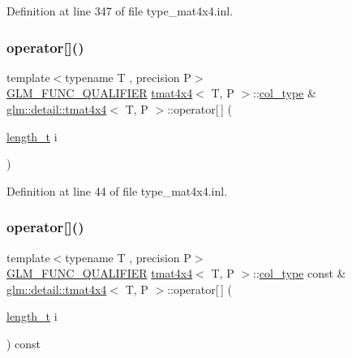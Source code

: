 Definition at line 347 of file type\+\_\+mat4x4.\+inl.

\mbox{\label{structglm_1_1detail_1_1tmat4x4_a92cd87a0fb94052edec19265cfa505dd}} 
\subsubsection{\texorpdfstring{operator[]()}{operator[]()}\hspace{0.1cm}{\footnotesize\ttfamily [1/2]}}
{\footnotesize\ttfamily template$<$typename T , precision P$>$ \\
\hyperlink{setup_8hpp_a33fdea6f91c5f834105f7415e2a64407}{G\+L\+M\+\_\+\+F\+U\+N\+C\+\_\+\+Q\+U\+A\+L\+I\+F\+I\+ER} \hyperlink{structglm_1_1detail_1_1tmat4x4}{tmat4x4}$<$ T, P $>$\+::\hyperlink{structglm_1_1detail_1_1tmat4x4_ade9e794ddd9c2758005f29ddb84e320f}{col\+\_\+type} \& \hyperlink{structglm_1_1detail_1_1tmat4x4}{glm\+::detail\+::tmat4x4}$<$ T, P $>$\+::operator\mbox{[}$\,$\mbox{]} (\begin{DoxyParamCaption}\item[{\hyperlink{namespaceglm_a090a0de2260835bee80e71a702492ed9}{length\+\_\+t}}]{i }\end{DoxyParamCaption})}



Definition at line 44 of file type\+\_\+mat4x4.\+inl.

\mbox{\label{structglm_1_1detail_1_1tmat4x4_a944cec314978830da23bff87a465b913}} 
\subsubsection{\texorpdfstring{operator[]()}{operator[]()}\hspace{0.1cm}{\footnotesize\ttfamily [2/2]}}
{\footnotesize\ttfamily template$<$typename T , precision P$>$ \\
\hyperlink{setup_8hpp_a33fdea6f91c5f834105f7415e2a64407}{G\+L\+M\+\_\+\+F\+U\+N\+C\+\_\+\+Q\+U\+A\+L\+I\+F\+I\+ER} \hyperlink{structglm_1_1detail_1_1tmat4x4}{tmat4x4}$<$ T, P $>$\+::\hyperlink{structglm_1_1detail_1_1tmat4x4_ade9e794ddd9c2758005f29ddb84e320f}{col\+\_\+type} const  \& \hyperlink{structglm_1_1detail_1_1tmat4x4}{glm\+::detail\+::tmat4x4}$<$ T, P $>$\+::operator\mbox{[}$\,$\mbox{]} (\begin{DoxyParamCaption}\item[{\hyperlink{namespaceglm_a090a0de2260835bee80e71a702492ed9}{length\+\_\+t}}]{i }\end{DoxyParamCaption}) const}



